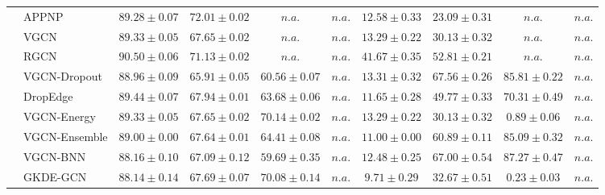\begin{table*}[!h]
{\begin{tabular}{ll|cccc|cccc}
        & APPNP & ${89.28\scriptscriptstyle \pm 0.07}$ & ${{72.01}\scriptscriptstyle \pm 0.02}$ & $n.a.$ & $n.a.$ & ${12.58\scriptscriptstyle \pm 0.33}$ & ${23.09\scriptscriptstyle \pm 0.31}$ & $n.a.$ & $n.a.$\\
        & VGCN & ${89.33\scriptscriptstyle \pm 0.05}$ & ${67.65\scriptscriptstyle \pm 0.02}$ & $n.a.$ & $n.a.$ & ${13.29\scriptscriptstyle \pm 0.22}$ & ${30.13\scriptscriptstyle \pm 0.32}$ & $n.a.$ & $n.a.$\\
        & RGCN & ${\mathbf{90.50}\scriptscriptstyle \pm 0.06}$ & ${71.13\scriptscriptstyle \pm 0.02}$ & $n.a.$ & $n.a.$ & ${41.67\scriptscriptstyle \pm 0.35}$ & ${52.81\scriptscriptstyle \pm 0.21}$ & $n.a.$ & $n.a.$\\
        & VGCN-Dropout & ${88.96\scriptscriptstyle \pm 0.09}$ & ${65.91\scriptscriptstyle \pm 0.05}$ & ${60.56\scriptscriptstyle \pm 0.07}$ & $n.a.$ & ${13.31\scriptscriptstyle \pm 0.32}$ & ${{67.56}\scriptscriptstyle \pm 0.26}$ & ${85.81\scriptscriptstyle \pm 0.22}$ & $n.a.$\\
        & DropEdge & ${89.44\scriptscriptstyle \pm 0.07}$ & ${67.94\scriptscriptstyle \pm 0.01}$ & ${63.68\scriptscriptstyle \pm 0.06}$ & $n.a.$ & ${11.65\scriptscriptstyle \pm 0.28}$ & ${49.77\scriptscriptstyle \pm 0.33}$ & ${70.31\scriptscriptstyle \pm 0.49}$ & $n.a.$\\
        & VGCN-Energy & ${89.33\scriptscriptstyle \pm 0.05}$ & ${67.65\scriptscriptstyle \pm 0.02}$ & ${{70.14}\scriptscriptstyle \pm 0.02}$ & $n.a.$ & ${13.29\scriptscriptstyle \pm 0.22}$ & ${30.13\scriptscriptstyle \pm 0.32}$ & ${0.89\scriptscriptstyle \pm 0.06}$ & $n.a.$\\
        & VGCN-Ensemble & ${89.00\scriptscriptstyle \pm 0.00}$ & ${67.64\scriptscriptstyle \pm 0.01}$ & ${64.41\scriptscriptstyle \pm 0.08}$ & $n.a.$ & ${11.00\scriptscriptstyle \pm 0.00}$ & ${60.89\scriptscriptstyle \pm 0.11}$ & ${85.09\scriptscriptstyle \pm 0.32}$ & $n.a.$\\
        & VGCN-BNN & ${88.16\scriptscriptstyle \pm 0.10}$ & ${67.09\scriptscriptstyle \pm 0.12}$ & ${59.69\scriptscriptstyle \pm 0.35}$ & $n.a.$ & ${12.48\scriptscriptstyle \pm 0.25}$ & ${67.00\scriptscriptstyle \pm 0.54}$ & ${{87.27}\scriptscriptstyle \pm 0.47}$ & $n.a.$\\
        & GKDE-GCN & ${88.14\scriptscriptstyle \pm 0.14}$ & ${67.69\scriptscriptstyle \pm 0.07}$ & ${70.08\scriptscriptstyle \pm 0.14}$ & $n.a.$ & ${9.71\scriptscriptstyle \pm 0.29}$ & ${32.67\scriptscriptstyle \pm 0.51}$ & ${0.23\scriptscriptstyle \pm 0.03}$ & $n.a.$\\

\end{tabular}}
\end{table*}
